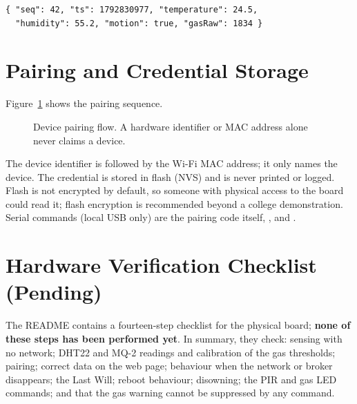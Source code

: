 \documentclass[12pt,a4paper,oneside]{report}
\newcommand{\code}[1]{\texttt{\detokenize{#1}}}
\begin{document}
\begin{lstlisting}[caption={Telemetry payload (maximum 1024 bytes; at least one reading is required)},label={lst:telemetry}]
{ "seq": 42, "ts": 1792830977, "temperature": 24.5,
  "humidity": 55.2, "motion": true, "gasRaw": 1834 }
\end{lstlisting}

\section{Pairing and Credential Storage}
Figure~\ref{fig:pairing} shows the pairing sequence.
\begin{figure}[H]
\centering
{}
\caption{Device pairing flow. A hardware identifier or MAC address alone never claims a device.}
\label{fig:pairing}
\end{figure}
The device identifier is \code{esp32-} followed by the Wi-Fi MAC address; it only names the device. The credential is stored in flash (NVS) and is never printed or logged. Flash is not encrypted by default, so someone with physical access to the board could read it; flash encryption is recommended beyond a college demonstration. Serial commands (local USB only) are the pairing code itself, \code{status}, \code{reset} and \code{help}.

\section{Hardware Verification Checklist (Pending)}
\label{sec:hwchecklist}
The README contains a fourteen-step checklist for the physical board; \textbf{none of these steps has been performed yet}. In summary, they check: sensing with no network; DHT22 and MQ-2 readings and calibration of the gas thresholds; pairing; correct data on the web page; behaviour when the network or broker disappears; the Last Will; reboot behaviour; disowning; the PIR and gas LED commands; and that the gas warning cannot be suppressed by any command.
\end{document}
